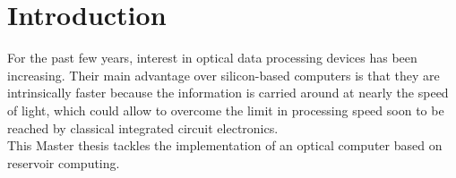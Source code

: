 \chapter{Introduction}
\label{introduction}

For the past few years, interest in optical data processing devices has been increasing. Their main advantage over silicon-based computers is that they are intrinsically faster because the information is carried around at nearly the speed of light, which could allow to overcome the limit in processing speed soon to be reached by classical integrated circuit electronics.\\

This Master thesis tackles the implementation of an optical computer based on reservoir computing.
